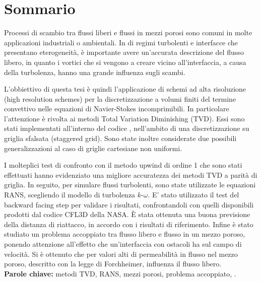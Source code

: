 \chapter*{Sommario}
Processi di scambio tra flussi liberi e flussi in mezzi porosi sono comuni in 
molte applicazioni industriali o ambientali. In di regimi turbolenti e 
interfacce che presentano eterogeneità, è importante avere un'accurata 
descrizione del flusso libero, in quanto i vortici che si vengono a creare 
vicino all'interfaccia, a causa della turbolenza, hanno una grande influenza 
sugli scambi.

L'obbiettivo di questa tesi è quindi l'applicazione di schemi ad alta 
risoluzione (high resolution schemes) per la discretizzazione a volumi finiti 
del termine convettivo nelle equazioni di Navier-Stokes incomprimibili. In 
particolare l'attenzione è rivolta ai metodi Total Variation Diminishing (TVD). 
Essi sono stati implementati all'interno del codice \DUMUX, nell'ambito di una 
discretizzazione su griglia sfalsata (staggered grid). Sono state inoltre 
considerate due possibili generalizzazioni al caso di griglie cartesiane non 
uniformi.

I molteplici test di confronto con il metodo upwind di ordine 1 che sono stati 
effettuati hanno evidenziato una migliore accuratezza dei metodi TVD a parità 
di griglia. 
In seguito, per simulare flussi turbolenti, sono state utilizzate le equazioni 
RANS, scegliendo il modello di turbolenza $k\text{-}\omega$. E' stato 
utilizzato il test del backward facing step per validare i risultati, 
confrontandoli con quelli disponibili prodotti dal codice CFL3D della NASA. È 
stata ottenuta una buona previsione della distanza di riattacco, in accordo con 
i risultati di riferimento. Infine è stato studiato un problema accoppiato tra 
flusso libero e flusso in un mezzo poroso, ponendo attenzione all'effetto che 
un'interfaccia con ostacoli ha sul campo di velocità. Si è ottenuto 
che per valori alti di permeabilità in flusso nel mezzo poroso, descritto con 
la legge di Forchheimer, influenza il flusso libero.
\\[\baselineskip]
\textbf{Parole chiave:} metodi TVD, RANS, mezzi porosi, problema accoppiato, 
\DUMUX.
